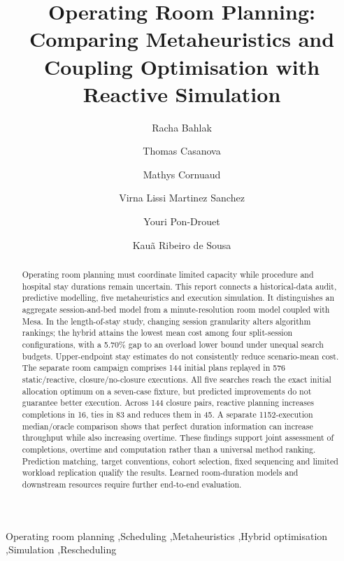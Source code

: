 \documentclass[final,3p,a4paper,authoryear]{elsarticle}
\begin{document}
\begin{frontmatter}
\title{Operating Room Planning: Comparing Metaheuristics and Coupling
Optimisation with Reactive Simulation}
\author{Racha Bahlak}
\author{Thomas Casanova}
\author{Mathys Cornuaud}
\author{Virna Lissi Martinez Sanchez}
\author{Youri Pon-Drouet}
\author{Kau{\~a} Ribeiro de Sousa}

\begin{abstract}
Operating room planning must coordinate limited capacity while procedure
and hospital stay durations remain uncertain. This report connects a
historical-data audit, predictive modelling, five metaheuristics and execution
simulation. It distinguishes an aggregate session-and-bed model from a
minute-resolution room model coupled with Mesa. In the length-of-stay study,
changing session granularity alters algorithm rankings; the hybrid attains
the lowest mean cost among four split-session configurations, with a 5.70\%
gap to an overload lower bound under unequal search budgets. Upper-endpoint
stay estimates do not consistently reduce scenario-mean cost. The separate
room campaign comprises 144 initial plans replayed in 576 static/reactive,
closure/no-closure executions. All five searches reach the exact initial
allocation optimum on a seven-case fixture, but predicted improvements do
not guarantee better execution. Across 144 closure pairs, reactive planning
increases completions in 16, ties in 83 and reduces them in 45. A separate
1152-execution median/oracle comparison shows that perfect duration information
can increase throughput while also increasing overtime. These findings support
joint assessment of completions, overtime and computation rather than a
universal method ranking. Prediction matching, target conventions, cohort
selection, fixed sequencing and limited workload replication qualify the
results. Learned room-duration models and downstream resources require
further end-to-end evaluation.
\end{abstract}

\begin{keyword}
Operating room planning \sep Scheduling \sep Metaheuristics
\sep Hybrid optimisation \sep Simulation \sep Rescheduling
\end{keyword}
\end{frontmatter}

\setcounter{section}{1}






\FloatBarrier

\FloatBarrier



\renewcommand{\bibsection}{\section{References}\label{sec:references}}
\begingroup
\renewcommand{\bibfont}{\fontsize{8}{9}\selectfont}


\endgroup
\end{document}

